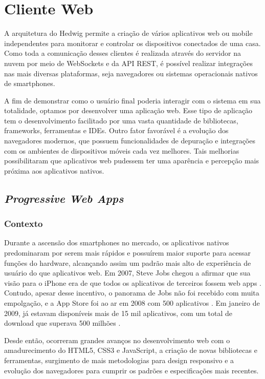 \section{Cliente Web}
A arquitetura do Hedwig permite a criação de vários aplicativos web ou mobile independentes para monitorar e controlar os dispositivos conectados de uma casa. Como toda a comunicação desses clientes é realizada através do servidor na nuvem por meio de WebSockets e da API REST, é possível realizar integrações nas mais diversas plataformas, seja navegadores ou sistemas operacionais nativos de smartphones.

A fim de demonstrar como o usuário final poderia interagir com o sistema em sua totalidade, optamos por desenvolver uma aplicação web. Esse tipo de aplicação tem o desenvolvimento facilitado por uma vasta quantidade de bibliotecas, frameworks, ferramentas e IDEs. Outro fator favorável é a evolução dos navegadores modernos, que possuem funcionalidades de depuração e integrações com os ambientes de dispositivos móveis cada vez melhores. Tais melhorias possibilitaram que aplicativos web pudessem ter uma aparência e percepção mais próxima aos aplicativos nativos.

\subsection{\textit{Progressive Web Apps}}

\subsubsection{Contexto}
Durante a ascensão dos smartphones no mercado, os aplicativos nativos predominaram por serem mais rápidos e possuírem maior suporte para acessar funções do hardware, alcançando assim um padrão mais alto de experiência de usuário do que aplicativos web. Em 2007, Steve Jobs chegou a afirmar que sua visão para o iPhone era de que todos os aplicativos de terceiros fossem web apps \cite{9to5mac}. Contudo, apesar desse incentivo, o panorama de Jobs não foi recebido com muita empolgação, e a App Store foi ao ar em 2008 com 500 aplicativos \cite{ricker}. Em janeiro de 2009, já estavam disponíveis mais de 15 mil aplicativos, com um total de download que superava 500 milhões \cite{myslewski}.

Desde então, ocorreram grandes avanços no desenvolvimento web com o amadurecimento do HTML5, CSS3 e JavaScript, a criação de novas bibliotecas e ferramentas, surgimento de mais metodologias para design responsivo e a evolução dos navegadores para cumprir os padrões e especificações mais recentes.

